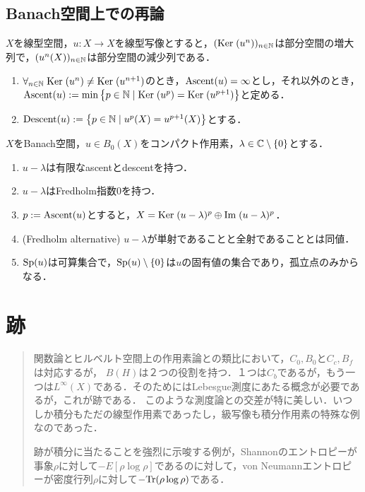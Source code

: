\documentclass[uplatex,dvipdfmx]{jsreport}
\begin{document}
\subsection{Banach空間上での再論}

\begin{definition}
    $X$を線型空間，$u:X\to X$を線型写像とすると，$(\mathrm{Ker}\;(u^n))_{n\in\mathbb{N}}$は部分空間の増大列で，$(u^n(X))_{n\in\mathbb{N}}$は部分空間の減少列である．
    \begin{enumerate}
        \item $\forall_{n\in\mathbb{N}}\;\mathrm{Ker}\;(u^n)\ne\mathrm{Ker}\;(u^{n+1})$のとき，$\mathrm{Ascent}(u)=\infty$とし，それ以外のとき，$\mathrm{Ascent}(u):=\min\left\{p\in\mathbb{N}\mid\mathrm{Ker}\;(u^p)=\mathrm{Ker}\;(u^{p+1})\right\}$と定める．
        \item $\mathrm{Descent}(u):=\left\{p\in\mathbb{N}\mid u^p(X)=u^{p+1}(X)\right\}$とする．
    \end{enumerate}
\end{definition}

\begin{theorem}
    $X$をBanach空間，$u\in B_0(X)$をコンパクト作用素，$\lambda\in\mathbb{C}\setminus\{0\}$とする．
    \begin{enumerate}
        \item $u-\lambda$は有限なascentとdescentを持つ．
        \item $u-\lambda$はFredholm指数$0$を持つ．
        \item $p:=\mathrm{Ascent}(u)$とすると，$X=\mathrm{Ker}\;(u-\lambda)^p\oplus\mathrm{Im}\;(u-\lambda)^p$．
        \item (Fredholm alternative) $u-\lambda$が単射であることと全射であることとは同値．
        \item $\mathrm{Sp}(u)$は可算集合で，$\mathrm{Sp}(u)\setminus\{0\}$は$u$の固有値の集合であり，孤立点のみからなる．
    \end{enumerate}
\end{theorem}

\section{跡}

\begin{quotation}
    関数論とヒルベルト空間上の作用素論との類比において，$C_0,B_0$と$C_c,B_f$は対応するが，
    $B(H)$は２つの役割を持つ．１つは$C_b$であるが，もう一つは$L^\infty(X)$である．そのためにはLebesgue測度にあたる概念が必要であるが，これが跡である．
    このような測度論との交差が特に美しい．いつしか積分もただの線型作用素であったし，級写像も積分作用素の特殊な例なのであった．

    跡が積分に当たることを強烈に示唆する例が，Shannonのエントロピーが事象$\rho$に対して$-E[\rho\log\rho]$であるのに対して，von Neumannエントロピーが密度行列$\rho$に対して$-\mathrm{Tr}(\rho\log\rho)$である．
\end{quotation}
\end{document}
